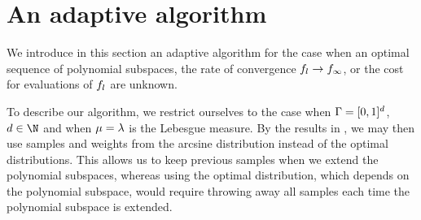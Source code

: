 \section{An adaptive algorithm}
\label{sec:adaptive}
We introduce in this section an adaptive algorithm for the case when an optimal sequence of polynomial subspaces, the rate of convergence $f_l\to f_{\infty}$, or the cost for evaluations of $f_l$ are unknown. 

To describe our algorithm, we restrict ourselves to the case when $\Gamma=[0,1]^{d}$, $\dps\in\N$ and when $\mu=\lambda$ is the Lebesgue measure.
 By the results in , we may then use samples and weights from the arcsine distribution instead of the optimal distributions. This allows us to keep previous samples when we extend the polynomial subspaces, whereas using the optimal distribution, which depends on the polynomial subspace, would require throwing away all samples each time the polynomial subspace is extended.
 
